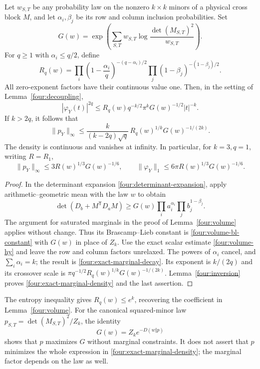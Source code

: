 \begin{theorem}\label{four:exact-marginal}
Let \(w_{S,T}\) be any probability law on the nonzero
\(k\times k\) minors of a physical cross block \(M\), and let
\(\alpha_i,\beta_j\) be its row and column inclusion probabilities.
Set
\[
 G(w)=\exp\left(\sum_{S,T}w_{S,T}
                 \log\frac{\det(M_{S,T})^2}{w_{S,T}}\right).
\]
For \(q\geq1\) with \(\alpha_i\leq q/2\), define
\[
 R_q(w)=
 \prod_i\left(1-\frac{\alpha_i}{q}\right)^{-(q-\alpha_i)/2}
 \prod_j(1-\beta_j)^{-(1-\beta_j)/2}.
\]
All zero-exponent factors have their continuous value one.
Then, in the setting of Lemma~\ref{four:decoupling},
\begin{equation}\label{four:exact-marginal-decay}
 |\varphi_Y(t)|^{2q}
 \leq R_q(w)q^{-k/2}\pi^kG(w)^{-1/2}|t|^{-k}.
\end{equation}
If \(k>2q\), it follows that
\begin{equation}\label{four:exact-marginal-density}
 \|p_Y\|_\infty
 \leq\frac{k}{(k-2q)\sqrt q}\,
                  R_q(w)^{1/k}G(w)^{-1/(2k)}.
\end{equation}
The density is continuous and vanishes at infinity.
In particular, for \(k=3,q=1\), writing \(R=R_1\),
\begin{equation}\label{four:q1-exact}
 \|p_Y\|_\infty\leq3R(w)^{1/3}G(w)^{-1/6},\qquad
 \|\varphi_Y\|_1\leq6\pi R(w)^{1/3}G(w)^{-1/6}.
\end{equation}
\end{theorem}
\begin{proof}
In the determinant expansion
\eqref{four:determinant-expansion}, apply arithmetic--geometric
mean with the law \(w\) to obtain
\[
 \det(D_b+M^{\mathsf T}D_aM)
 \geq G(w)\prod_i a_i^{\alpha_i}
                   \prod_jb_j^{1-\beta_j}.
\]
The argument for saturated marginals in the proof of
Lemma~\ref{four:volume} applies without change.
Thus its Brascamp--Lieb constant is
\eqref{four:volume-bl-constant} with \(G(w)\) in place of \(Z_k\).
Use the exact scalar estimate \eqref{four:volume-hy} and leave
the row and column factors unrelaxed.
The powers of \(\alpha_i\) cancel, and
\(\sum_i\alpha_i=k\); the result is
\eqref{four:exact-marginal-decay}.
Its exponent is \(k/(2q)\) and its crossover scale is
\(\pi q^{-1/2}R_q(w)^{1/k}G(w)^{-1/(2k)}\).
Lemma~\ref{four:inversion} proves
\eqref{four:exact-marginal-density} and the last assertion.
\end{proof}

The entropy inequality gives \(R_q(w)\leq e^k\), recovering
the coefficient in Lemma~\ref{four:volume}.  For the canonical squared-minor law
\(p_{S,T}=\det(M_{S,T})^2/Z_k\), the identity
\[
 G(w)=Z_k e^{-D(w\Vert p)}
\]
shows that \(p\) maximizes \(G\) without marginal constraints.
It does not assert that \(p\) minimizes the whole expression
in \eqref{four:exact-marginal-density}; the marginal factor
depends on the law as well.

